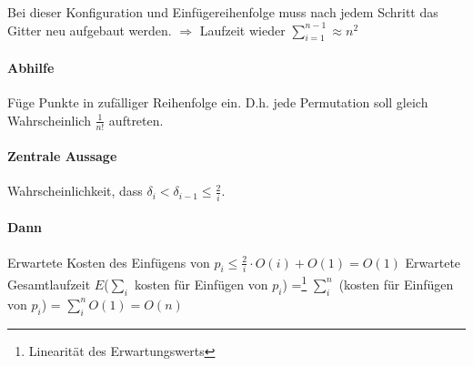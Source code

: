 
\par\medskip
Bei dieser Konfiguration und Einfügereihenfolge muss nach jedem Schritt das Gitter neu aufgebaut werden. $\Rightarrow$ Laufzeit wieder $\sum\limits_{i=1}^{n-1} \approx n^2$
\par\medskip

\paragraph*{Abhilfe} Füge Punkte in zufälliger Reihenfolge ein. D.h. jede Permutation soll gleich Wahrscheinlich $\frac{1}{n!}$ auftreten. %

\paragraph*{Zentrale Aussage} Wahrscheinlichkeit, dass $\delta_i < \delta_{i-1} \leq \frac{2}{i}$.

\paragraph*{Dann} Erwartete Kosten des Einfügens von $p_i \leq \frac{2}{i} \cdot O(i) + O(1) = O(1)$
Erwartete Gesamtlaufzeit $E$($\sum\limits_i$ kosten für Einfügen von $p_i$) =\footnote{Linearität des Erwartungswerts} $\sum\limits_i^n$ (kosten für Einfügen von $p_i$) = $\sum\limits_i^n O(1) = O(n)$